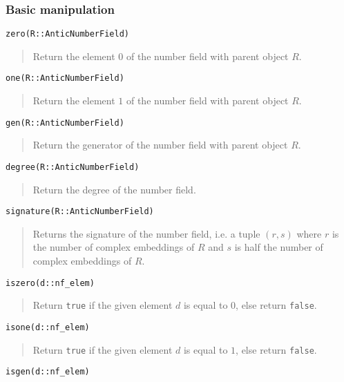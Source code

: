 \documentclass[a4paper,10pt]{article}
\newcommand{\code}{\lstinline}
\newcommand{\desc}[1]{\vspace{-3mm}\begin{quote}#1\end{quote}}
\begin{document}
{{\subsubsection{Basic manipulation}

\begin{lstlisting}
zero(R::AnticNumberField)
\end{lstlisting}

\desc{Return the element $0$ of the number field with parent object $R$.}

\begin{lstlisting}
one(R::AnticNumberField)
\end{lstlisting}

\desc{Return the element $1$ of the number field with parent object $R$.}

\begin{lstlisting}
gen(R::AnticNumberField)
\end{lstlisting}

\desc{Return the generator of the number field with parent object $R$.}

\begin{lstlisting}
degree(R::AnticNumberField)
\end{lstlisting}

\desc{Return the degree of the number field.}

\begin{lstlisting}
signature(R::AnticNumberField)
\end{lstlisting}

\desc{Returns the signature of the number field, i.e. a tuple $(r, s)$ where $r$ is
the number of complex embeddings of $R$ and $s$ is half the number of complex embeddings of $R$.}

\begin{lstlisting}
iszero(d::nf_elem)
\end{lstlisting}

\desc{Return \code{true} if the given element $d$ is equal to $0$, else return
\code{false}.}

\begin{lstlisting}
isone(d::nf_elem)
\end{lstlisting}

\desc{Return \code{true} if the given element $d$ is equal to $1$, else return
\code{false}.}

\begin{lstlisting}
isgen(d::nf_elem)
\end{lstlisting}

}}
\end{document}
